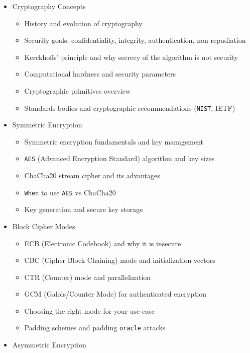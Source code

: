 \documentclass[
]{article}
\providecommand{\tightlist}{%
  \setlength{\itemsep}{0pt}\setlength{\parskip}{0pt}}
\begin{document}
\begin{itemize}
\tightlist
\item
  Cryptography Concepts

  \begin{itemize}
  \tightlist
  \item
    History and evolution of cryptography
  \item
    Security goals: confidentiality, integrity, authentication,
    non-repudiation
  \item
    Kerckhoffs' principle and why secrecy of the algorithm is not
    security
  \item
    Computational hardness and security parameters
  \item
    Cryptographic primitives overview
  \item
    Standards bodies and cryptographic recommendations (\texttt{NIST},
    IETF)
  \end{itemize}
\item
  Symmetric Encryption

  \begin{itemize}
  \tightlist
  \item
    Symmetric encryption fundamentals and key management
  \item
    \texttt{AES} (Advanced Encryption Standard) algorithm and key sizes
  \item
    ChaCha20 stream cipher and its advantages
  \item
    \texttt{When} to use \texttt{AES} vs ChaCha20
  \item
    Key generation and secure key storage
  \end{itemize}
\item
  Block Cipher Modes

  \begin{itemize}
  \tightlist
  \item
    ECB (Electronic Codebook) and why it is insecure
  \item
    CBC (Cipher Block Chaining) mode and initialization vectors
  \item
    CTR (Counter) mode and parallelization
  \item
    GCM (Galois/Counter Mode) for authenticated encryption
  \item
    Choosing the right mode for your use case
  \item
    Padding schemes and padding \texttt{oracle} attacks
  \end{itemize}
\item
  Asymmetric Encryption


\end{itemize}
\end{document}
